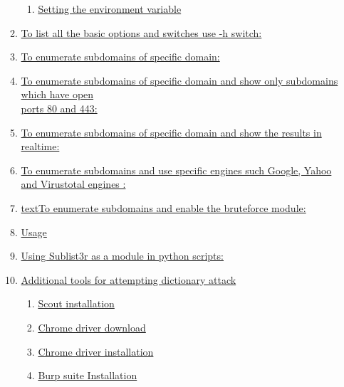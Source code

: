 \documentclass[12pt]{article}
\begin{document}
\begin{enumerate}
\begin{enumerate}
\begin{enumerate}
                \item \hyperref[subsubsec:setting-the-environment-variable]{Setting the environment variable}
            \end{enumerate}
            \item \hyperref[subsec:to-list-all-the-basic-options-and-switches-use-h-switch]{To list all the basic options and switches use -h switch:}
            \item \hyperref[subsec:to-enumerate-subdomains-of-specific-domain]{To enumerate subdomains of specific domain:}
            \item \hyperref[subsec:to-enumerate-subdomains-of-specific-domain-and-show-only-subdomains-which-have-open-ports-80-and-443]{To enumerate subdomains of specific domain and show only subdomains which have open\\
            ports 80 and 443:}
            \item \hyperref[subsec:to-enumerate-subdomains-of-specific-domain-and-show-the-results-in-realtime]{To enumerate subdomains of specific domain and show the results in realtime:}
            \item \hyperref[subsec:to-enumerate-subdomains-and-use-specific-engines-such-google-yahoo-and-virustotal-engines]{To enumerate subdomains and use specific engines such Google, Yahoo and Virustotal engines :}
            \item \hyperref[subsec:to-enumerate-subdomains-and-enable-the-bruteforce-module]{textTo enumerate subdomains and enable the bruteforce module:}
            \item \hyperref[subsec:usage]{Usage}
            \item \hyperref[subsec:using-sublist3r-as-a-module-in-python-scripts]{Using Sublist3r as a module in python scripts:}
            \item \hyperref[subsec:additional-tools-for-attempting-dictionary-attack]{Additional tools for attempting dictionary attack}
            \begin{enumerate}
                \item \hyperref[subsubsec:scout-installation]{Scout installation}
                \item \hyperref[subsubsec:chrome-driver-download]{Chrome driver download}
                \item \hyperref[subsubsec:chrome-driver-installation]{Chrome driver installation}
                \item \hyperref[subsubsec:burp-suite-installation]{Burp suite Installation}

\end{enumerate}
\end{enumerate}
\end{enumerate}
\end{document}
